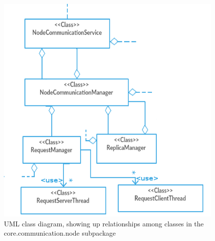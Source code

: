\documentclass{article}
\begin{document}
\begin{figure}
\centering
\includegraphics[scale=0.40]{core_communication_node}
\caption{UML class diagram, showing up relationships among classes in the core.communication.node subpackage}
\label{fig:class_diag_core.communication.node	}
\end{figure}
\end{document}
